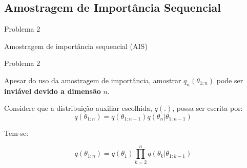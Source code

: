 \documentclass{beamer}
\begin{document}
\subsection{Amostragem de Importância Sequencial}

\begin{frame}{Problema 2}
    \begin{block}{}
      \Huge  Amostragem de importância sequencial (AIS)
    \end{block}
\end{frame}




\begin{frame}{Problema 2}

Apesar do uso da amostragem de importância, amostrar $q_n(\theta_{1:n})$ pode ser \textbf{inviável devido a dimensão} $n$.

\vspace{0.5cm}

\pause

Considere que a distribuição auxiliar escolhida, $q(.)$, possa ser escrita por:
$$ q(\theta_{1:n})  = q(\theta_{1:n-1})q(\theta_n|\theta_{1:n-1})$$

\vspace{0.5cm}

\pause
Tem-se:

$$ q(\theta_{1:n})  = q(\theta_1)\prod_{k=2}^n q(\theta_k|\theta_{1:k-1})$$

\end{frame}
\end{document}
